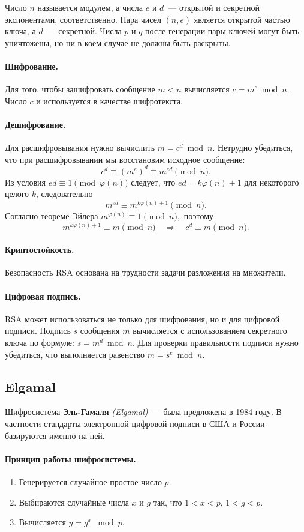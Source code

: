 \documentclass[a4paper,10pt]{article}
\begin{document}
Число $n$ называется модулем, а числа $e$ и $d$~--- открытой и секретной экспонентами, соответственно.
Пара чисел $(n,e)$ является открытой частью ключа, а $d$~--- секретной. Числа $p$ и $q$ после
генерации пары ключей могут быть уничтожены, но ни в коем случае не должны быть раскрыты.
 
\paragraph{Шифрование.}
Для того, чтобы зашифровать сообщение $m<n$ вычисляется $c=m^e\bmod n. $
Число $c$ и используется в качестве шифротекста. 

\paragraph{Дешифрование.}
Для расшифровывания нужно вычислить $m=c^d\bmod n.$
Нетрудно убедиться, что при расшифровывании мы восстановим исходное сообщение:
    $$c^d\equiv (m^e)^d\equiv m^{ed}\pmod n.$$
Из условия $ed\equiv 1\pmod{\varphi(n)}$
следует, что $ed=k\varphi(n)+1$ для некоторого целого $k$, следовательно
    $$m^{ed}\equiv m^{k\varphi(n)+1}\pmod n.$$
Согласно теореме Эйлера
    $m^{\varphi(n)}\equiv 1\pmod n, $
поэтому
$$m^{k\varphi(n)+1}\equiv m \pmod n \quad \Rightarrow \quad c^d\equiv m\pmod n.$$

\paragraph{Криптостойкость.} 
Безопасность RSA основана на трудности задачи разложения на множители.

\paragraph{Цифровая подпись.}
RSA может использоваться не только для шифрования, но и для цифровой подписи. 
Подпись $s$ сообщения $m$ вычисляется с использованием секретного ключа по формуле:
    $s=m^d\bmod n.$
Для проверки правильности подписи нужно убедиться, что выполняется равенство
    $m=s^e\bmod n.$

\subsection{Elgamal}
Шифросистема {\bf Эль-Гамаля} {\it (Elgamal)}~--- была предложена в 1984 году. 
В частности стандарты электронной цифровой подписи в США и России базируются именно на ней.
\paragraph{Принцип работы шифросистемы.} 
\begin{enumerate}
   \item Генерируется случайное простое число $p$.
   \item Выбираются случайные числа $x$ и $g$ так, что $1 < x < p$, $1 < g < p$.
   \item Вычисляется $y = g^x \mod p$.
\end{enumerate}
\end{document}
